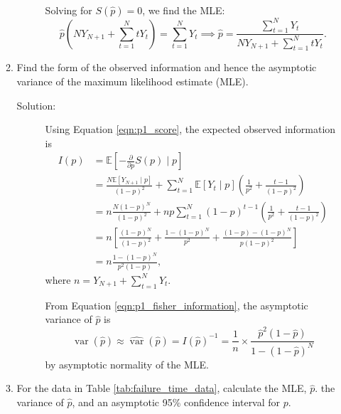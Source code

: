 \documentclass[letterpaper,11pt]{article}
\begin{document}
\begin{enumerate}
\begin{enumerate}
\begin{description}
      Solving for $S\left(\hat{p}\right) = 0$, we find the MLE:
      \begin{equation}
        \hat{p}\left(
          NY_{N+1} + \sum_{t=1}^{N}tY_t
        \right) = \sum_{t=1}^N Y_t
        \implies
        \boxed{
          \hat{p} = \frac{\sum_{t=1}^N Y_t}
          {NY_{N+1} + \sum_{t=1}^{N}tY_t}.
        }
        \label{eqn:p1_mle}
      \end{equation}
    \end{description}
  \item Find the form of the observed information and hence the asymptotic
    variance of the maximum likelihood estimate (MLE).
    \begin{description}
    \item[Solution:] Using Equation \ref{eqn:p1_score}, the expected observed
      information is
      \begin{align}
        I\left(p\right)
        &= \mathbb{E}\left[-\frac{\partial}{\partial p}S\left(p\right) \mid p\right]
          \nonumber\\
        &= \frac{N\mathbb{E}\left[Y_{N+1} \mid p\right]}{(1-p)^2}
          + \sum_{t=1}^N\mathbb{E}\left[Y_t \mid p\right]
          \left(
          \frac{1}{p^2} + \frac{t-1}{\left(1-p\right)^2}
          \right)
          \nonumber \\
        &= n\frac{N\left(1-p\right)^N}{(1-p)^2}
          + np\sum_{t=1}^N
          \left(1 - p\right)^{t-1}
          \left(
          \frac{1}{p^2} + \frac{t-1}{\left(1-p\right)^2}
          \right)
          \nonumber \\
        &= n\left[
          \frac{\left(1-p\right)^N}{(1-p)^2}
          +
          \frac{1 - \left(1 - p\right)^N}{p^2}
          +
          \frac{(1-p) - (1-p)^N}{p(1-p)^2}
          \right] \nonumber \\
        &= \boxed{n\frac{1 - \left(1 - p\right)^N}
          {p^2\left(1 - p\right)},} \label{eqn:p1_fisher_information}
      \end{align}
      where $n = Y_{N+1} + \sum_{t=1}^N Y_t$.

      From Equation \ref{eqn:p1_fisher_information}, the asymptotic variance of
      $\hat{p}$ is
      \begin{equation}
        \operatorname{var}\left(\hat{p}\right)
        \approx
        \hat{\operatorname{var}}\left(\hat{p}\right) = 
        I\left(\hat{p}\right)^{-1} = \frac{1}{n} \times
        \frac{\hat{p}^2\left(1-\hat{p}\right)}
        {1 - \left(1-\hat{p}\right)^N}
        \label{eqn:p1_variance}
      \end{equation}
      by asymptotic normality of the MLE.
    \end{description}
  \item For the data in Table \ref{tab:failure_time_data}, calculate the MLE,
    $\hat{p}$. the variance of $\hat{p}$, and an asymptotic
    95\% confidence interval for $p$.


\end{enumerate}
\end{enumerate}
\end{document}
